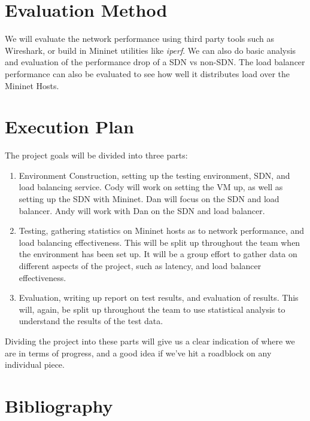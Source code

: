 \documentclass[12pt,letterpaper,onecolumn,draftclsnofoot]{IEEEtran}
\begin{document}
\section{Evaluation Method}
We will evaluate the network performance using third party tools such as 
Wireshark, or build in Mininet utilities like \textit{iperf}.\cite{design} We
can also do basic analysis and evaluation of the performance drop of a SDN vs
non-SDN. The load balancer performance can also be evaluated to see how well it
distributes load over the Mininet Hosts.

\section{Execution Plan}
The project goals will be divided into three parts:

\begin{enumerate}
\item Environment Construction, setting up the testing environment, SDN, and 
	load balancing service. Cody will work on setting the VM up, as well as
	setting up the SDN with Mininet. Dan will focus on the SDN and load
	balancer. Andy will work with Dan on the SDN and load balancer.
\item Testing, gathering statistics on Mininet hosts as to network performance,
	and load balancing effectiveness. This will be split up throughout the
	team when the environment has been set up. It will be a group effort
	to gather data on different aspects of the project, such as latency, 
	and load balancer effectiveness.
\item Evaluation, writing up report on test results, and evaluation of results.
	This will, again, be split up throughout the team to use statistical
	analysis to understand the results of the test data.
\end{enumerate}

Dividing the project into these parts will give us a clear indication of where
we are in terms of progress, and a good idea if we've hit a roadblock on any
individual piece. 

\section{Bibliography}


\end{document}
